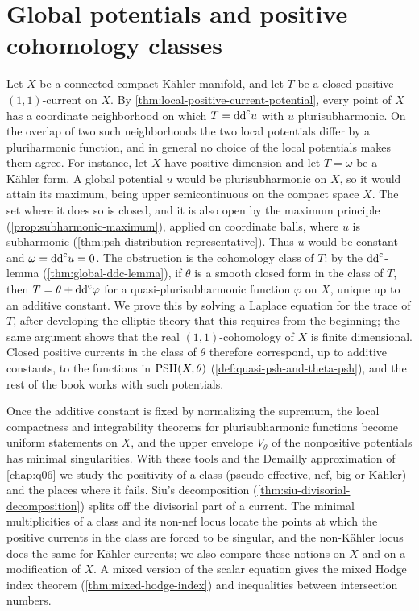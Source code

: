\chapter{Global potentials and positive cohomology classes}
\label{chap:global-potentials}

Let $X$ be a connected compact K\"ahler manifold, and let $T$ be a closed positive $(1,1)$-current on $X$. By \cref{thm:local-positive-current-potential}, every point of $X$ has a coordinate neighborhood on which $T=\mathrm{dd}^{\mathrm{c}} u$ with $u$ plurisubharmonic. On the overlap of two such neighborhoods the two local potentials differ by a pluriharmonic function, and in general no choice of the local potentials makes them agree. For instance, let $X$ have positive dimension and let $T=\omega$ be a K\"ahler form. A global potential $u$ would be plurisubharmonic on $X$, so it would attain its maximum, being upper semicontinuous on the compact space $X$. The set where it does so is closed, and it is also open by the maximum principle (\cref{prop:subharmonic-maximum}), applied on coordinate balls, where $u$ is subharmonic (\cref{thm:psh-distribution-representative}). Thus $u$ would be constant and $\omega=\mathrm{dd}^{\mathrm{c}} u=0$. The obstruction is the cohomology class of $T$: by the $\mathrm{dd}^{\mathrm{c}}$-lemma (\cref{thm:global-ddc-lemma}), if $\theta$ is a smooth closed form in the class of $T$, then $T=\theta+\mathrm{dd}^{\mathrm{c}}\varphi$ for a quasi-plurisubharmonic function $\varphi$ on $X$, unique up to an additive constant. We prove this by solving a Laplace equation for the trace of $T$, after developing the elliptic theory that this requires from the beginning; the same argument shows that the real $(1,1)$-cohomology of $X$ is finite dimensional. Closed positive currents in the class of $\theta$ therefore correspond, up to additive constants, to the functions in $\mathrm{PSH}(X,\theta)$ (\cref{def:quasi-psh-and-theta-psh}), and the rest of the book works with such potentials.

Once the additive constant is fixed by normalizing the supremum, the local compactness and integrability theorems for plurisubharmonic functions become uniform statements on $X$, and the upper envelope $V_\theta$ of the nonpositive potentials has minimal singularities. With these tools and the Demailly approximation of \cref{chap:q06} we study the positivity of a class (pseudo-effective, nef, big or K\"ahler) and the places where it fails. Siu's decomposition (\cref{thm:siu-divisorial-decomposition}) splits off the divisorial part of a current. The minimal multiplicities of a class and its non-nef locus locate the points at which the positive currents in the class are forced to be singular, and the non-K\"ahler locus does the same for K\"ahler currents; we also compare these notions on $X$ and on a modification of $X$. A mixed version of the scalar equation gives the mixed Hodge index theorem (\cref{thm:mixed-hodge-index}) and inequalities between intersection numbers.

